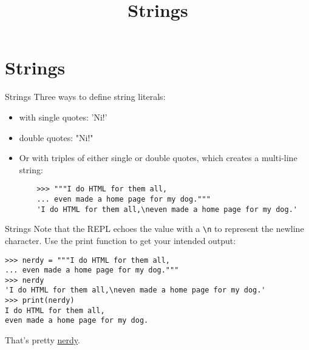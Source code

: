 \documentclass[smaller, aspectratio=1610]{beamer}
\date{}
\title{Strings}
\begin{document}
\maketitle


\section{Strings}
\label{sec:org7f34a92}

\begin{frame}[label={sec:org2ce5209},fragile]{Strings}
 Three ways to define string literals:

\begin{itemize}
\item with single quotes: 'Ni!'

\item double quotes: "Ni!"

\item Or with triples of either single or double quotes, which creates a multi-line string:

\lstset{language=Python,label= ,caption= ,captionpos=b,numbers=none}
\begin{lstlisting}
    >>> """I do HTML for them all,
    ... even made a home page for my dog."""
    'I do HTML for them all,\neven made a home page for my dog.'
\end{lstlisting}
\end{itemize}
\end{frame}

\begin{frame}[label={sec:org33c9e9d},fragile]{Strings}
 Note that the REPL echoes the value with a \texttt{\textbackslash{}n} to represent the newline character. Use the print function to get your intended output:

\lstset{language=Python,label= ,caption= ,captionpos=b,numbers=none}
\begin{lstlisting}
>>> nerdy = """I do HTML for them all,
... even made a home page for my dog."""
>>> nerdy
'I do HTML for them all,\neven made a home page for my dog.'
>>> print(nerdy)
I do HTML for them all,
even made a home page for my dog.
\end{lstlisting}

That's pretty \href{http://bravehunde.org}{nerdy}.
\end{frame}
\end{document}
